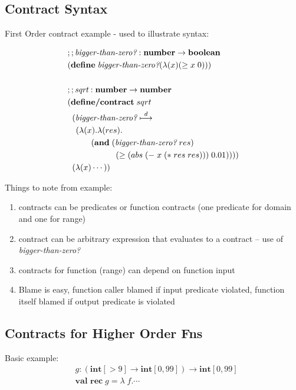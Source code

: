 \documentclass[12pt]{article}	%
\newcommand{\keyw}[1]{ \ensuremath{ \textbf{#1} } }
\newcommand{\integer}{ \keyw{int} }
\newcommand{\num}{ \keyw{number} }
\newcommand{\bool}{ \keyw{boolean} }
\newcommand{\numnum}{ \ensuremath{ \num\rightarrow\num } }
\newcommand{\numbool}{ \ensuremath{ \num\rightarrow\bool } }
\newcommand{\define}{ \keyw{define} }
\newcommand{\defcontract}{ \keyw{define/contract} }
\newcommand{\dcontract}{ \ensuremath{ \stackrel{d}{\longmapsto} } }
\begin{document}
\subsection*{Contract Syntax}
First Order contract example - used to illustrate syntax:

\newcommand{\biggerthanzero}{ \textit{bigger-than-zero?} }

\begin{align*}
& ;; \biggerthanzero : \numbool \\
& (\define \; \biggerthanzero (\lambda (x) (\geq x \; 0))) \\
& \\
& ;; \textit{sqrt} : \numnum \\
& (\defcontract \; sqrt \\
& \;\;(\biggerthanzero \dcontract \\
& \;\;\;\,(\lambda(x).\lambda(res). \\
& \hspace{10mm}(\keyw{and} \; (\biggerthanzero \; res) \\
& \hspace{20.5mm}               (\geq (abs \; (- \; x \; (* \; res \; res))) \; 0.01)))) \\
& \;\;(\lambda (x) \cdots))
\end{align*}

Things to note from example:
\begin{enumerate}
	\item contracts can be predicates or function contracts (one predicate for domain and one for range)
	\item contract can be arbitrary expression that evaluates to a contract -- use of \biggerthanzero
	\item contracts for function (range) can depend on function input
	\item Blame is easy, function caller blamed if input predicate violated, function itself blamed if output predicate is violated
\end{enumerate}


\subsection*{Contracts for Higher Order Fns}

\newcommand{\greaterthannine}{ \textit{greater-than-nine?} }
\newcommand{\betweenzeroandninetynine}{ \textit{between-zero-and-ninety-nine?} }

Basic example:
\begin{align*}
& g:(\integer[>9]\rightarrow\integer[0,99])\rightarrow\integer[0,99] \\
& \keyw{val rec} \; g = \lambda \; f.\cdots	
\end{align*}
\end{document}
